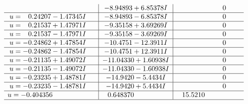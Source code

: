 \documentclass[1p]{elsarticle_modified}
\theoremstyle{definition}
\begin{document}
$$\begin{array}{c|c|c}
 & -8.94893 + 6.85378 I & \phantom{-0.000000 } 0 \\ \hline\begin{aligned}
u &= \phantom{-}0.24207 - 1.47345 I\end{aligned}
 & -8.94893 - 6.85378 I & \phantom{-0.000000 } 0 \\ \hline\begin{aligned}
u &= \phantom{-}0.21537 + 1.47971 I\end{aligned}
 & -9.35158 + 3.69269 I & \phantom{-0.000000 } 0 \\ \hline\begin{aligned}
u &= \phantom{-}0.21537 - 1.47971 I\end{aligned}
 & -9.35158 - 3.69269 I & \phantom{-0.000000 } 0 \\ \hline\begin{aligned}
u &= -0.24862 + 1.47854 I\end{aligned}
 & -10.4751 - 12.3911 I & \phantom{-0.000000 } 0 \\ \hline\begin{aligned}
u &= -0.24862 - 1.47854 I\end{aligned}
 & -10.4751 + 12.3911 I & \phantom{-0.000000 } 0 \\ \hline\begin{aligned}
u &= -0.21135 + 1.49072 I\end{aligned}
 & -11.04330 + 1.60938 I & \phantom{-0.000000 } 0 \\ \hline\begin{aligned}
u &= -0.21135 - 1.49072 I\end{aligned}
 & -11.04330 - 1.60938 I & \phantom{-0.000000 } 0 \\ \hline\begin{aligned}
u &= -0.23235 + 1.48781 I\end{aligned}
 & -14.9420 - 5.4434 I & \phantom{-0.000000 } 0 \\ \hline\begin{aligned}
u &= -0.23235 - 1.48781 I\end{aligned}
 & -14.9420 + 5.4434 I & \phantom{-0.000000 } 0 \\ \hline\begin{aligned}
u &= -0.404356\phantom{ +0.000000I}\end{aligned}
 & \phantom{-}0.648370\phantom{ +0.000000I} & \phantom{-}15.5210\phantom{ +0.000000I}\\
 \hline 
 \end{array}$$\newpage
\newpage\renewcommand{\arraystretch}{1}
\end{document}
